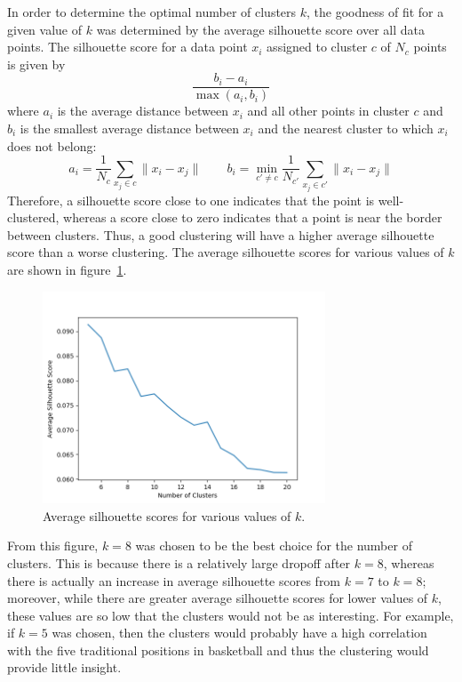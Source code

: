 In order to determine the optimal number of clusters $k$, the goodness of fit for
a given value of $k$ was determined by the average silhouette score over all data
points. The silhouette score for a data point $x_i$ assigned to cluster $c$ of $N_c$
points is given by
$$
\frac{b_i - a_i}{\max(a_i, b_i)}
$$
where $a_i$ is the average distance between $x_i$ and all other points in cluster
$c$ and $b_i$ is the smallest average distance between $x_i$ and the nearest cluster
to which $x_i$ does not belong:
$$
a_i = \frac{1}{N_c} \sum_{x_j \in c} \lVert x_i - x_j \rVert \qquad
b_i = \min_{c' \neq c} \frac{1}{N_{c'}} \sum_{x_j \in c'} \lVert x_i - x_j
\rVert
$$
Therefore, a silhouette score close to one indicates that the point is
well-clustered, whereas a score close to zero indicates that a point is near the
border between clusters. Thus, a good clustering will have a higher average
silhouette score than a worse clustering. The average silhouette scores for various
values of $k$ are shown in figure~\ref{fig:sils}.

\begin{figure}
    \centering
    \includegraphics[width=0.75\textwidth]{figures/sil_scores}
    \caption{Average silhouette scores for various values of $k$.}
    \label{fig:sils}
\end{figure}

From this figure, $k=8$ was chosen to be the best choice for the number of clusters.
This is because there is a relatively large dropoff after $k=8$, whereas there
is actually an increase in average silhouette scores from $k=7$ to $k=8$; moreover,
while there are greater average silhouette scores for lower values of $k$, these
values are so low that the clusters would not be as interesting. For example, if
$k=5$ was chosen, then the clusters would probably have a high correlation with
the five traditional positions in basketball and thus the clustering would provide
little insight.

